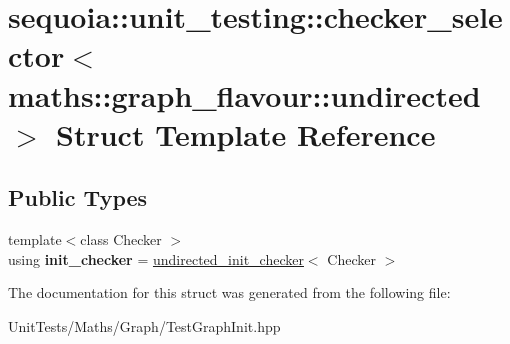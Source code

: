 \hypertarget{structsequoia_1_1unit__testing_1_1checker__selector_3_01maths_1_1graph__flavour_1_1undirected_01_4}{}\section{sequoia\+::unit\+\_\+testing\+::checker\+\_\+selector$<$ maths\+::graph\+\_\+flavour\+::undirected $>$ Struct Template Reference}
\label{structsequoia_1_1unit__testing_1_1checker__selector_3_01maths_1_1graph__flavour_1_1undirected_01_4}
\subsection*{Public Types}
\begin{DoxyCompactItemize}
\item 
\mbox{\label{structsequoia_1_1unit__testing_1_1checker__selector_3_01maths_1_1graph__flavour_1_1undirected_01_4_a8a29bfd85acbabe248e7a0e83e5b9cbb}} 
{\footnotesize template$<$class Checker $>$ }\\using {\bfseries init\+\_\+checker} = \mbox{\hyperlink{classsequoia_1_1unit__testing_1_1undirected__init__checker}{undirected\+\_\+init\+\_\+checker}}$<$ Checker $>$
\end{DoxyCompactItemize}


The documentation for this struct was generated from the following file\+:\begin{DoxyCompactItemize}
\item 
Unit\+Tests/\+Maths/\+Graph/Test\+Graph\+Init.\+hpp\end{DoxyCompactItemize}
